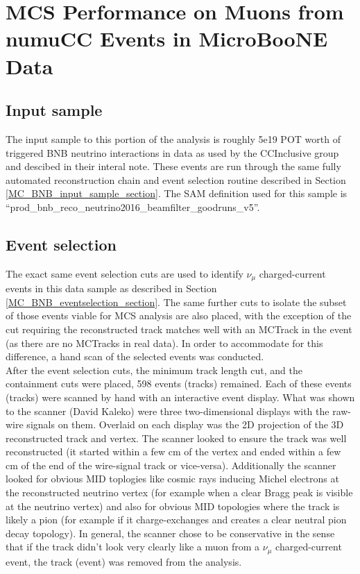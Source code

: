 \section{MCS Performance on Muons from numuCC Events in MicroBooNE Data}\label{data_performance_section}

\subsection{Input sample}
The input sample to this portion of the analysis is roughly 5e19 POT worth of triggered BNB neutrino interactions in {\ub} data as used by the CCInclusive group and descibed in their interal note\cite{CCIncInternalNote}. These events are run through the same fully automated reconstruction chain and event selection routine described in Section \ref{MC_BNB_input_sample_section}. The SAM definition used for this sample is ``prod\_bnb\_reco\_neutrino2016\_beamfilter\_goodruns\_v5''.

\subsection{Event selection}
The exact same event selection cuts are used to identify $\nu_\mu$ charged-current events in this data sample as described in Section \ref{MC_BNB_eventselection_section}. The same further cuts to isolate the subset of those events viable for MCS analysis are also placed, with the exception of the cut requiring the reconstructed track matches well with an {\sc MCTrack} in the event (as there are no {\sc MCTracks} in real data). In order to accommodate for this difference, a hand scan of the selected events was conducted.\\

After the event selection cuts, the minimum track length cut, and the containment cuts were placed, 598 events (tracks) remained. Each of these events (tracks) were scanned by hand with an interactive event display. What was shown to the scanner (David Kaleko) were three two-dimensional displays with the raw-wire signals on them. Overlaid on each display was the 2D projection of the 3D reconstructed track and vertex. The scanner looked to ensure the track was well reconstructed (it started within a few cm of the vertex and ended within a few cm of the end of the wire-signal track or vice-versa). Additionally the scanner looked for obvious MID toplogies like cosmic rays inducing Michel electrons at the reconstructed neutrino vertex (for example when a clear Bragg peak is visible at the neutrino vertex) and also for obvious MID topologies where the track is likely a pion (for example if it charge-exchanges and creates a clear neutral pion decay topology). In general, the scanner chose to be conservative in the sense that if the track didn't look very clearly like a muon from a $\nu_\mu$ charged-current event, the track (event) was removed from the analysis.\\

